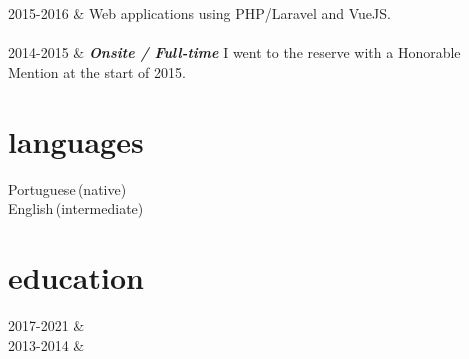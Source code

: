 \documentclass[]{cv-mauri}
\begin{document}
\begin{tabularcv}
		    \\[\vspacepar]
		    \\[\vspacepar]
    2015-2016   &   
                    \newline
                    Web applications using PHP/Laravel and VueJS.
                    \\[\vspacepar]
                    \\[\vspacepar]
	2014-2015   &   
					\textbf{\textit{Onsite / Full-time}}
					\newline
					I went to the reserve with a Honorable Mention at the start of 2015.
\end{tabularcv}

\section*{languages}
\begin{tabularcv}
    Portuguese\,(native) \\
    English\,(intermediate)
\end{tabularcv}

\section*{education}
\begin{tabularcv}
    2017-2021   &   
                    \\[\vspacepar] %
    2013-2014   &   
\end{tabularcv}

\end{document}
